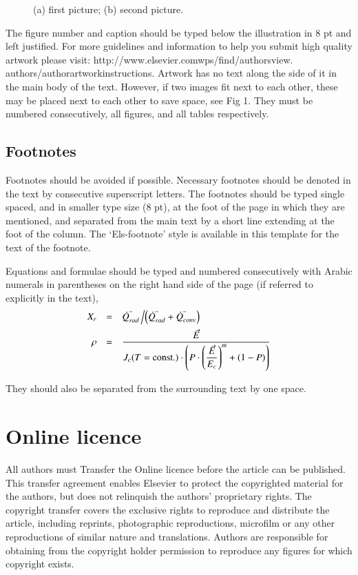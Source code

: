 \documentclass[3p,times,procedia]{elsarticle}
\begin{document}
\begin{figure}[h]
\caption{(a) first picture; (b) second picture.}
\end{figure}


The figure number and caption should be typed below the illustration in 8 pt and left justified. For more guidelines and information to help you submit high quality artwork please visit: http://www.elsevier.comwps/find/authorsview. authors/authorartworkinstructions. Artwork has no text along the side of it in the main body of the text. However, if two images fit next to each other, these may be placed next to each other to save space, see Fig 1. They must be numbered consecutively, all figures, and all tables respectively.


\subsection{Footnotes}
Footnotes should be avoided if possible. Necessary footnotes should be denoted in the text by consecutive superscript letters. The footnotes should be typed single spaced, and in smaller type size (8 pt), at the foot of the page in which they are mentioned, and separated from the main text by a short line extending at the foot of the column. The `Els-footnote' style is available in this template for the text of the footnote.

Equations and formulae should be typed and numbered consecutively with Arabic numerals in parentheses on the right hand side of the page (if referred to explicitly in the text),
\begin{equation}
\begin{array}{rcl}
\displaystyle X_r &=& \displaystyle\dot{Q}^{"}_{rad}\left/\left(\dot{Q}^{"}_{rad} + \dot{Q}^{"}_{conv}\right)\right.\\[6pt]
\displaystyle \rho &=& \displaystyle\frac{\vec{E}}{J_c(T={\rm const.})\cdot\left(P\cdot\left(\displaystyle\frac{\vec{E}}{E_c}\right)^m+(1-P)\right)}
\end{array}
\end{equation}

They should also be separated from the surrounding text by one space.

\section{Online licence}
All authors must Transfer the Online licence before the article can be published. This transfer agreement enables Elsevier to protect the copyrighted material for the authors, but does not relinquish the authors' proprietary rights. The copyright transfer covers the exclusive rights to reproduce and distribute the article, including reprints, photographic reproductions, microfilm or any other reproductions of similar nature and translations. Authors are responsible for obtaining from the copyright holder permission to reproduce any figures for which copyright exists.
\end{document}
